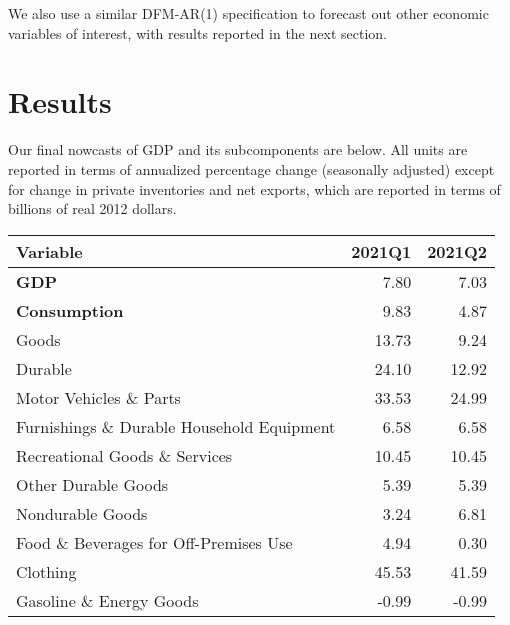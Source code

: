 \documentclass[11pt, letterpaper]{article}\usepackage[]{graphicx}\usepackage[]{color}
\begin{document}
We also use a similar DFM-AR(1) specification to forecast out other economic variables of interest, with results reported in the next section.


\section{Results}
Our final nowcasts of GDP and its subcomponents are below. All units are reported in terms of annualized percentage change (seasonally adjusted) except for change in private inventories and net exports, which are reported in terms of billions of real 2012 dollars.
\begin{table}[H]
\centering
\begingroup\fontsize{10pt}{12pt}\selectfont
\begin{tabular}{lrr}
  \hline
Variable & 2021Q1 & 2021Q2 \\ 
  \hline
\hspace{0mm} \textbf{GDP} & 7.80 & 7.03 \\ 
  \hspace{0mm} \textbf{Consumption} & 9.83 & 4.87 \\ 
  \hspace{8mm}  Goods & 13.73 & 9.24 \\ 
  \hspace{16mm}  Durable & 24.10 & 12.92 \\ 
  \hspace{24mm}  Motor Vehicles \& Parts & 33.53 & 24.99 \\ 
  \hspace{24mm}  Furnishings \& Durable Household Equipment & 6.58 & 6.58 \\ 
  \hspace{24mm}  Recreational Goods \& Services & 10.45 & 10.45 \\ 
  \hspace{24mm}  Other Durable Goods & 5.39 & 5.39 \\ 
  \hspace{16mm}  Nondurable Goods & 3.24 & 6.81 \\ 
  \hspace{24mm}  Food \& Beverages for Off-Premises Use & 4.94 & 0.30 \\ 
  \hspace{24mm}  Clothing & 45.53 & 41.59 \\ 
  \hspace{24mm}  Gasoline \& Energy Goods & -0.99 & -0.99 \\ 

\end{tabular}
\end{table}
\end{document}

